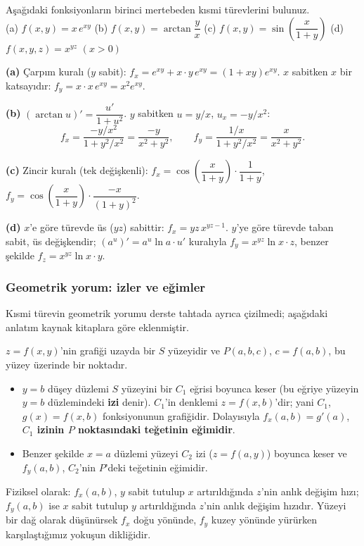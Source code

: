 \begin{soru}
Aşağıdaki fonksiyonların birinci mertebeden kısmi türevlerini bulunuz.\\
(a) $f(x,y)=x\,e^{xy}$ \qquad (b) $f(x,y)=\arctan\dfrac{y}{x}$ \qquad (c) $f(x,y)=\sin\!\left(\dfrac{x}{1+y}\right)$
\qquad (d) $f(x,y,z)=x^{yz}$ $(x>0)$
\end{soru}
\begin{cevap}
\textbf{(a)} Çarpım kuralı ($y$ sabit): $f_x=e^{xy}+x\cdot y\,e^{xy}=(1+xy)e^{xy}$. $x$ sabitken $x$ bir katsayıdır:
$f_y=x\cdot x\,e^{xy}=x^2e^{xy}$.

\textbf{(b)} $(\arctan u)'=\dfrac{u'}{1+u^2}$. $y$ sabitken $u=y/x$, $u_x=-y/x^2$:
\[ f_x=\frac{-y/x^2}{1+y^2/x^2}=\frac{-y}{x^2+y^2},\qquad f_y=\frac{1/x}{1+y^2/x^2}=\frac{x}{x^2+y^2}. \]

\textbf{(c)} Zincir kuralı (tek değişkenli): $f_x=\cos\!\left(\dfrac{x}{1+y}\right)\cdot\dfrac{1}{1+y}$,\quad
$f_y=\cos\!\left(\dfrac{x}{1+y}\right)\cdot\dfrac{-x}{(1+y)^2}$.

\textbf{(d)} $x$'e göre türevde üs ($yz$) sabittir: $f_x=yz\,x^{yz-1}$. $y$'ye göre türevde taban sabit, üs değişkendir;
$(a^{u})'=a^{u}\ln a\cdot u'$ kuralıyla $f_y=x^{yz}\ln x\cdot z$, benzer şekilde $f_z=x^{yz}\ln x\cdot y$.
\end{cevap}

\subsubsection{Geometrik yorum: izler ve eğimler}

\begin{bilgi}
Kısmi türevin geometrik yorumu derste tahtada ayrıca çizilmedi; aşağıdaki anlatım kaynak kitaplara göre eklenmiştir.
\end{bilgi}

$z=f(x,y)$'nin grafiği uzayda bir $S$ yüzeyidir ve $P(a,b,c)$, $c=f(a,b)$, bu yüzey üzerinde bir noktadır.
\begin{itemize}
  \item $y=b$ düşey düzlemi $S$ yüzeyini bir $C_1$ eğrisi boyunca keser (bu eğriye yüzeyin $y=b$ düzlemindeki
        \textbf{izi} denir). $C_1$'in denklemi $z=f(x,b)$'dir; yani $C_1$, $g(x)=f(x,b)$ fonksiyonunun grafiğidir.
        Dolayısıyla $f_x(a,b)=g'(a)$, \textbf{$C_1$ izinin $P$ noktasındaki teğetinin eğimidir}.
  \item Benzer şekilde $x=a$ düzlemi yüzeyi $C_2$ izi ($z=f(a,y)$) boyunca keser ve $f_y(a,b)$, $C_2$'nin $P$'deki
        teğetinin eğimidir.
\end{itemize}
Fiziksel olarak: $f_x(a,b)$, $y$ sabit tutulup $x$ artırıldığında $z$'nin anlık değişim hızı; $f_y(a,b)$ ise $x$ sabit
tutulup $y$ artırıldığında $z$'nin anlık değişim hızıdır. Yüzeyi bir dağ olarak düşünürsek $f_x$ doğu yönünde, $f_y$
kuzey yönünde yürürken karşılaştığımız yokuşun dikliğidir.

